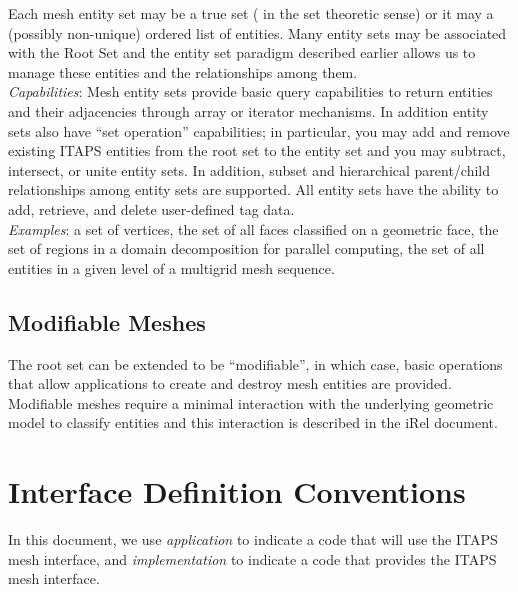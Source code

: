 \documentclass{article}
\begin{document}
Each mesh entity set may be a true set ( in the set theoretic 
sense) or it may a (possibly non-unique) ordered list of entities.  
Many entity sets may be associated with the Root Set and the entity 
set paradigm described earlier allows us to manage these entities 
and the relationships among them.  \\

\emph{Capabilities}: Mesh entity sets provide basic query capabilities 
to return entities and their adjacencies through array or iterator 
mechanisms. In addition entity sets also have ``set operation'' 
capabilities; in particular, you may add and remove existing 
ITAPS entities from the root set to the entity set and you may 
subtract, intersect, or unite entity sets. In addition, subset 
and hierarchical parent/child relationships among entity sets 
are supported. All entity sets have the ability to add, retrieve, 
and delete user-defined tag data.\\

\emph{Examples}: a set of vertices, the set of all faces classified 
on a geometric face, the set of regions in a domain decomposition 
for parallel computing, the set of all entities in a given level 
of a multigrid mesh sequence.

\subsection{Modifiable Meshes}

The root set can be extended to be ``modifiable'', in which case, 
basic operations that allow applications to create and destroy 
mesh entities are provided. Modifiable meshes require a minimal 
interaction with the underlying geometric model to classify entities 
and this interaction is described in the iRel document.


\section{Interface Definition Conventions}

In this document, we use \emph{application} to indicate a code that 
will use the ITAPS mesh interface, and \emph{implementation} to indicate 
a code that provides the ITAPS mesh interface.
\end{document}
